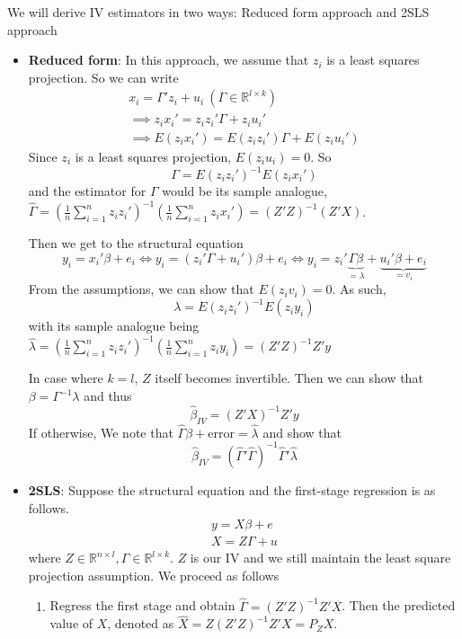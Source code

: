 \documentclass[12pt]{article}
\theoremstyle{definition}
\theoremstyle{property}
\theoremstyle{assumption}
\theoremstyle{example}
\theoremstyle{comment}
\begin{document}
We will derive IV estimators in two ways: Reduced form approach and 2SLS approach
\begin{itemize}
\item \textbf{Reduced form}: In this approach, we assume that $z_i$ is a least squares projection. So we can write
\begin{gather*}
x_i = \Gamma'z_i+u_i \ (\Gamma\in\mathbb{R}^{l\times k})\\
\implies z_ix_i'=z_iz_i'\Gamma+z_iu_i'\\
\implies E(z_ix_i')=E(z_iz_i')\Gamma+E(z_iu_i')
\end{gather*}
Since $z_i$ is a least squares projection, $E(z_iu_i)=0$. So
\[
\Gamma= E(z_iz_i')^{-1}E(z_ix_i')
\]
and the estimator for $\Gamma$ would be its sample analogue, $\widehat{\Gamma}=\left(\frac{1}{n}\sum_{i=1}^nz_iz_i'\right)^{-1}\left(\frac{1}{n}\sum_{i=1}^nz_ix_i'\right)=(Z'Z)^{-1}(Z'X)$.\par
Then we get to the structural equation 
\[
y_i=x_i'\beta+e_i \iff y_i =(z_i'\Gamma+u_i')\beta+e_i \iff y_i = z_i'\underbrace{\Gamma\beta}_{=\lambda}+\underbrace{u_i'\beta+e_i}_{=v_i}
\]
From the assumptions, we can show that $E(z_iv_i)=0$. As such, 
\[
\lambda=E(z_iz_i')^{-1}E(z_iy_i)
\]
with its sample analogue being $\hat{\lambda}=\left(\frac{1}{n}\sum_{i=1}^n z_iz_i'\right)^{-1} \left(\frac{1}{n}\sum_{i=1}^n z_iy_i\right)=(Z'Z)^{-1}Z'y$\par
In case where $k=l$, $Z$ itself becomes invertible. Then we can show that $\beta=\Gamma^{-1}\lambda$ and thus 
\[
\hat{\beta}_{IV}=(Z'X)^{-1}Z'y
\]
If otherwise, We note that $\widehat{\Gamma}\beta+\text{error}=\hat{\lambda}$ and show that 
\[
\hat{\beta}_{IV}=(\widehat{\Gamma}'\widehat{\Gamma})^{-1}\widehat{\Gamma}'\hat{\lambda}
\]
\item \textbf{2SLS}:  Suppose the structural equation and the first-stage regression is as follows.
\begin{gather*}
y=X\beta+e \tag{Structural}\\
X=Z\Gamma+u \tag{First Stage}
\end{gather*}
where $Z\in\mathbb{R}^{n\times l},\Gamma\in\mathbb{R}^{l\times k}$. $Z$ is our IV and we still maintain the least square projection assumption. We proceed as follows
\begin{enumerate}
\item Regress the first stage and obtain $\widehat{\Gamma}=(Z'Z)^{-1}Z'X$. Then the predicted value of $X$, denoted as $\widehat{X}=Z(Z'Z)^{-1}Z'X=P_ZX$.
\begin{mdframed}[backgroundcolor=green!5] 

\end{mdframed}
\end{enumerate}
\end{itemize}
\end{document}
